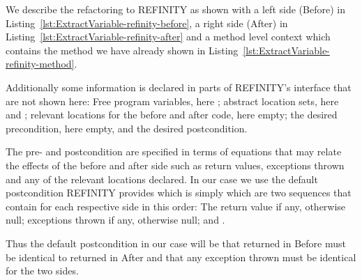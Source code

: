 We describe the refactoring to REFINITY as shown with a left side (Before) in Listing~\ref{lst:ExtractVariable-refinity-before},
a right side (After) in Listing~\ref{lst:ExtractVariable-refinity-after} and a method level context which contains the method we have already shown in Listing~\ref{lst:ExtractVariable-refinity-method}.

Additionally some information is declared in parts of REFINITY's interface that are not shown here:
Free program variables, here ; abstract location sets, here  and ; relevant locations for the before and after code, here empty;
the desired precondition, here empty, and the desired postcondition.

The pre- and postcondition are specified in terms of equations that may relate the effects of the before and after side such as return values, exceptions thrown and any of the relevant locations declared.
In our case we use the default postcondition REFINITY provides which is simply  which are two sequences that contain for each respective side in this order:
The return value if any, otherwise null; exceptions thrown if any, otherwise null; and .

Thus the default postcondition in our case will be that  returned in Before must be identical to  returned in After and that any exception thrown must be identical for the two sides.

